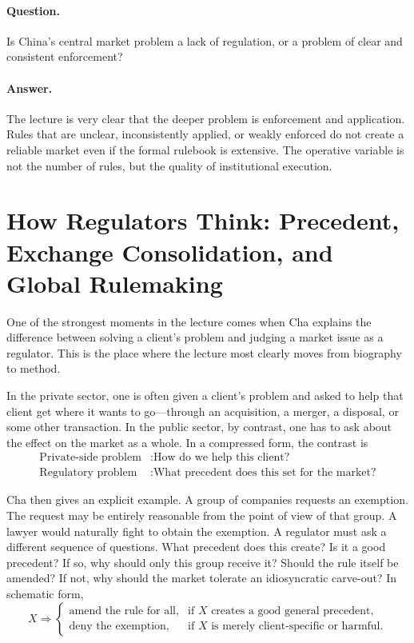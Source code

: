 \paragraph{Question.} Is China's central market problem a lack of regulation, or a problem of clear and consistent enforcement?

\paragraph{Answer.} The lecture is very clear that the deeper problem is enforcement and application. Rules that are unclear, inconsistently applied, or weakly enforced do not create a reliable market even if the formal rulebook is extensive. The operative variable is not the number of rules, but the quality of institutional execution.

\section{How Regulators Think: Precedent, Exchange Consolidation, and Global Rulemaking}

One of the strongest moments in the lecture comes when Cha explains the difference between solving a client's problem and judging a market issue as a regulator. This is the place where the lecture most clearly moves from biography to method.

In the private sector, one is often given a client's problem and asked to help that client get where it wants to go---through an acquisition, a merger, a disposal, or some other transaction. In the public sector, by contrast, one has to ask about the effect on the market as a whole. In a compressed form, the contrast is
\begin{align}
\text{Private-side problem} &: \text{How do we help this client?} \\
\text{Regulatory problem} &: \text{What precedent does this set for the market?}
\end{align}

Cha then gives an explicit example. A group of companies requests an exemption. The request may be entirely reasonable from the point of view of that group. A lawyer would naturally fight to obtain the exemption. A regulator must ask a different sequence of questions. What precedent does this create? Is it a good precedent? If so, why should only this group receive it? Should the rule itself be amended? If not, why should the market tolerate an idiosyncratic carve-out? In schematic form,
\begin{equation}
X \Rightarrow
\begin{cases}
\text{amend the rule for all}, & \text{if } X \text{ creates a good general precedent},\\[4pt]
\text{deny the exemption}, & \text{if } X \text{ is merely client-specific or harmful}.
\end{cases}
\end{equation}

